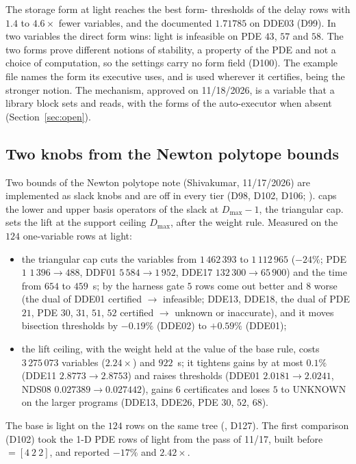 The storage form  at light reaches the best form- thresholds of the delay rows with $1.4$ to $4.6\times$ fewer variables, and the documented $1.71785$ on DDE03 (D99). In two variables the direct form wins: light  is infeasible on PDE $43$, $57$ and $58$. The two forms prove different notions of stability, a property of the PDE and not a choice of computation, so the settings carry no form field (D100). The example file names the form its executive uses, and  is used wherever it certifies, being the stronger notion. The mechanism, approved on 11/18/2026, is a variable  that a library block sets and  reads, with the forms of the auto-executor when absent (Section~\ref{sec:open}).

\subsection{Two knobs from the Newton polytope bounds}\label{sec:libpass-knobs}

Two bounds of the Newton polytope note (Shivakumar, 11/17/2026) are implemented as slack knobs and are off in every tier (D98, D102, D106; ).   caps the lower and upper basis operators of the slack at $D_{\max}-1$, the triangular cap.  sets the lift at the support ceiling $D_{\max}$, after the weight rule. Measured on the $124$ one-variable rows at light:
\begin{itemize}\setlength\itemsep{0pt}
\item the triangular cap cuts the variables from $1\,462\,393$ to $1\,112\,965$ ($-24\%$; PDE $1$ $1\,396\to488$, DDF01 $5\,584\to1\,952$, DDE17 $132\,300\to65\,900$) and the time from $654$ to $459$~s; by the harness gate $5$ rows come out better and $8$ worse (the dual of DDE01 certified $\to$ infeasible; DDE13, DDE18, the dual of PDE $21$, PDE $30$, $31$, $51$, $52$ certified $\to$ unknown or inaccurate), and it moves bisection thresholds by $-0.19\%$ (DDE02) to $+0.59\%$ (DDE01);
\item the lift ceiling, with the weight held at the value of the base rule, costs $3\,275\,073$ variables ($2.24\times$) and $922$~s; it tightens gains by at most $0.1\%$ (DDE11 $2.8773\to2.8753$) and raises thresholds (DDE01 $2.0181\to2.0241$, NDS08 $0.027389\to0.027442$), gains $6$ certificates and loses $5$ to UNKNOWN on the larger programs (DDE13, DDE26, PDE $30$, $52$, $68$).
\end{itemize}
The base is light on the $124$ rows on the same tree (, D127). The first comparison (D102) took the 1-D PDE rows of light from the pass of 11/17, built before  $=[4\ 2\ 2]$, and reported $-17\%$ and $2.42\times$.


